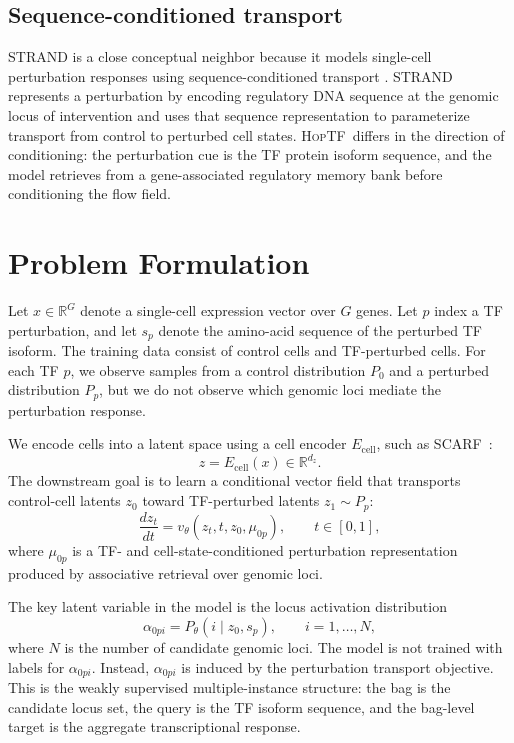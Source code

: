 \documentclass[11pt]{article}
\newcommand{\hoptf}{\textsc{HopTF}}
\newcommand{\scarf}{\textsc{SCARF}}
\begin{document}
\subsection{Sequence-conditioned transport}

STRAND is a close conceptual neighbor because it models single-cell perturbation responses using sequence-conditioned transport \citep{fu2026}. STRAND represents a perturbation by encoding regulatory DNA sequence at the genomic locus of intervention and uses that sequence representation to parameterize transport from control to perturbed cell states. \hoptf\ differs in the direction of conditioning: the perturbation cue is the TF protein isoform sequence, and the model retrieves from a gene-associated regulatory memory bank before conditioning the flow field.

\section{Problem Formulation}

Let \(x \in \mathbb{R}^G\) denote a single-cell expression vector over \(G\) genes. Let \(p\) index a TF perturbation, and let \(s_p\) denote the amino-acid sequence of the perturbed TF isoform. The training data consist of control cells and TF-perturbed cells. For each TF \(p\), we observe samples from a control distribution \(P_0\) and a perturbed distribution \(P_p\), but we do not observe which genomic loci mediate the perturbation response.

We encode cells into a latent space using a cell encoder \(E_{\mathrm{cell}}\), such as \scarf\ \citep{scarf2025}:
\begin{equation}
    z = E_{\mathrm{cell}}(x) \in \mathbb{R}^{d_z}.
\end{equation}
The downstream goal is to learn a conditional vector field that transports control-cell latents \(z_0\) toward TF-perturbed latents \(z_1 \sim P_p\):
\begin{equation}
    \frac{d z_t}{dt} = v_\theta(z_t, t, z_0, \mu_{0p}), \qquad t \in [0,1],
\end{equation}
where \(\mu_{0p}\) is a TF- and cell-state-conditioned perturbation representation produced by associative retrieval over genomic loci.

The key latent variable in the model is the locus activation distribution
\begin{equation}
    \alpha_{0pi} = P_\theta(i \mid z_0, s_p), \qquad i = 1,\ldots,N,
\end{equation}
where \(N\) is the number of candidate genomic loci. The model is not trained with labels for \(\alpha_{0pi}\). Instead, \(\alpha_{0pi}\) is induced by the perturbation transport objective. This is the weakly supervised multiple-instance structure: the bag is the candidate locus set, the query is the TF isoform sequence, and the bag-level target is the aggregate transcriptional response.
\end{document}
